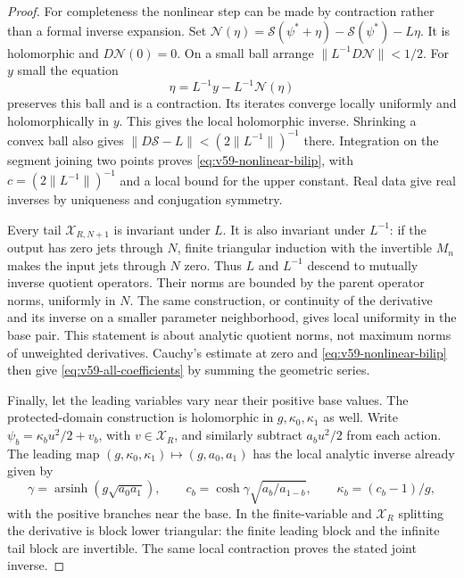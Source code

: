 \begin{proof}
For completeness the nonlinear step can be made by contraction rather
than a formal inverse expansion.  Set
$\mathcal N(\eta)=\mathscr S(\psi^*+\eta)-\mathscr S(\psi^*)-L\eta$.
It is holomorphic and $D\mathcal N(0)=0$.  On a small ball arrange
$\|L^{-1}D\mathcal N\|<1/2$.  For $y$ small the equation
\[
                   \eta=L^{-1}y-L^{-1}\mathcal N(\eta)
\]
preserves this ball and is a contraction.  Its iterates converge locally
uniformly and holomorphically in $y$.  This gives the local holomorphic
inverse.  Shrinking a convex ball also gives
$\|D\mathscr S-L\|<(2\|L^{-1}\|)^{-1}$ there.  Integration on the
segment joining two points proves \eqref{eq:v59-nonlinear-bilip}, with
$c=(2\|L^{-1}\|)^{-1}$ and a local bound for the upper constant.
Real data give real inverses by uniqueness and conjugation symmetry.

Every tail $\mathscr X_{R,N+1}$ is invariant under $L$.
It is also invariant under $L^{-1}$: if the output has zero jets through
$N$, finite triangular induction with the invertible $M_n$ makes the
input jets through $N$ zero.  Thus $L$ and $L^{-1}$ descend to mutually
inverse quotient operators.  Their norms are bounded by the parent
operator norms, uniformly in $N$.  The same construction, or continuity
of the derivative and its inverse on a smaller parameter neighborhood,
gives local uniformity in the base pair.  This statement is about
analytic quotient norms, not maximum norms of unweighted derivatives.
Cauchy's estimate at zero and \eqref{eq:v59-nonlinear-bilip} then give
\eqref{eq:v59-all-coefficients} by summing the geometric series.

Finally, let the leading variables vary near their positive base values.
The protected-domain construction is holomorphic in $g,\kappa_0,\kappa_1$
as well.  Write $\psi_b=\kappa_bu^2/2+v_b$, with $v\in\mathscr X_R$,
and similarly subtract $a_bu^2/2$ from each action.  The leading map
$(g,\kappa_0,\kappa_1)\mapsto(g,a_0,a_1)$ has the local analytic
inverse already given by
\[
 \gamma=\operatorname{arsinh}(g\sqrt{a_0a_1}),\qquad
 c_b=\cosh\gamma\sqrt{a_b/a_{1-b}},\qquad \kappa_b=(c_b-1)/g,
\]
with the positive branches near the base.  In the finite-variable and
$\mathscr X_R$ splitting the derivative is block lower triangular:
the finite leading block and the infinite tail block are invertible.
The same local contraction proves the stated joint inverse.
\end{proof}

